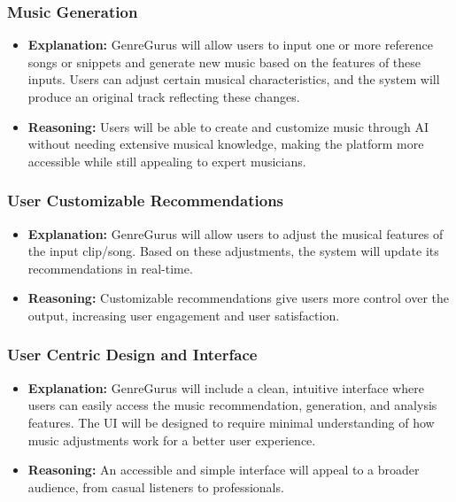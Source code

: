 \documentclass{article}
\begin{document}
\subsubsection*{Music Generation}
\begin{itemize}
    \item \textbf{Explanation:} GenreGurus will allow users to input one or more reference songs or snippets and generate new music based on the features of these inputs. Users can adjust certain musical characteristics, and the system will produce an original track reflecting these changes.
    \item \textbf{Reasoning:} Users will be able to create and customize music through AI without needing extensive musical knowledge, making the platform more accessible while still appealing to expert musicians.
\end{itemize}

\subsubsection*{User Customizable Recommendations}
\begin{itemize}
    \item \textbf{Explanation:} GenreGurus will allow users to adjust the musical features of the input clip/song. Based on these adjustments, the system will update its recommendations in real-time.
    \item \textbf{Reasoning:} Customizable recommendations give users more control over the output, increasing user engagement and user satisfaction.
\end{itemize}

\subsubsection*{User Centric Design and Interface}
\begin{itemize}
    \item \textbf{Explanation:} GenreGurus will include a clean, intuitive interface where users can easily access the music recommendation, generation, and analysis features. The UI will be designed to require minimal understanding of how music adjustments work for a better user experience.
    \item \textbf{Reasoning:} An accessible and simple interface will appeal to a broader audience, from casual listeners to professionals.
\end{itemize}
\end{document}
